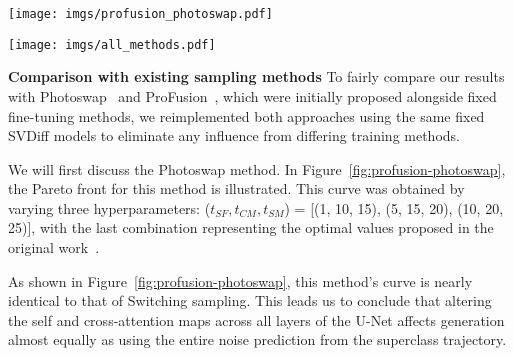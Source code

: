 \begin{figure*}[!ht]
\centering
\begin{minipage}{.477\textwidth}
  \centering
  \texttt{[image: imgs/profusion\_photoswap.pdf]}
  \vspace{-0.20in}
  \label{fig:profusion-photoswap}
\end{minipage}
\hfill
\begin{minipage}{.477\textwidth}
  \centering
  \texttt{[image: imgs/all\_methods.pdf]}
  \vspace{-0.20in}
  \label{fig:all-methods}
\end{minipage}
  \vspace{-0.16in}
\end{figure*} 

\textbf{Comparison with existing sampling methods}
To fairly compare our results with Photoswap~\citep{photoswap} and ProFusion~\citep{profusion}, which were initially proposed alongside fixed fine-tuning methods, we reimplemented both approaches using the same fixed SVDiff models to eliminate any influence from differing training methods.

We will first discuss the Photoswap method. In Figure~\ref{fig:profusion-photoswap}, the Pareto front for this method is illustrated. This curve was obtained by varying three hyperparameters: ($t_{SF}, t_{CM}, t_{SM}$) = [(1, 10, 15), (5, 15, 20), (10, 20, 25)], with the last combination representing the optimal values proposed in the original work~\citep{photoswap}. 

As shown in Figure~\ref{fig:profusion-photoswap}, this method's curve is nearly identical to that of Switching sampling. This leads us to conclude that altering the self and cross-attention maps across all layers of the U-Net affects generation almost equally as using the entire noise prediction from the superclass trajectory.

